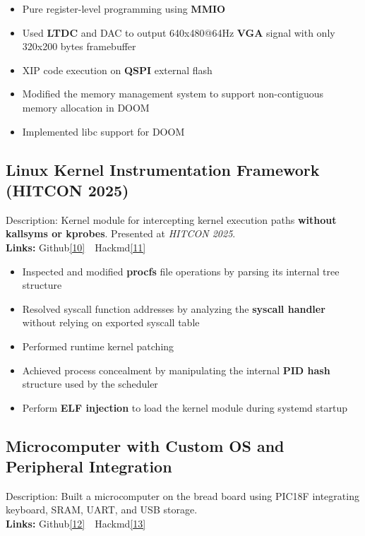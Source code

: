 \documentclass[11pt]{article}
\begin{document}
\begin{itemize}
  \item Pure register-level programming using \textbf{MMIO}
  \item Used \textbf{LTDC} and DAC to output 640x480@64Hz \textbf{VGA} signal with only 320x200 bytes framebuffer
  \item XIP code execution on \textbf{QSPI} external flash
  \item Modified the memory management system to support non-contiguous memory allocation in DOOM
  \item Implemented libc support for DOOM
\end{itemize}

\subsection*{Linux Kernel Instrumentation Framework (HITCON 2025)}
\vspace{1pt}
Description: Kernel module for intercepting kernel execution paths \textbf{without kallsyms or kprobes}. Presented at \emph{HITCON 2025}.\\
{\small\textbf{Links:} Github\hyperlink{l10}{[10]}\ \ Hackmd\hyperlink{l11}{[11]}}

\begin{itemize}
  \item Inspected and modified \textbf{procfs} file operations by parsing its internal tree structure
  \item Resolved syscall function addresses by analyzing the \textbf{syscall handler} without relying on exported syscall table
  \item Performed runtime kernel patching
  \item Achieved process concealment by manipulating the internal \textbf{PID hash} structure used by the scheduler
  \item Perform \textbf{ELF injection} to load the kernel module during systemd startup
\end{itemize}

\subsection*{Microcomputer with Custom OS and Peripheral Integration}
\vspace{1pt}
Description: Built a microcomputer on the bread board using PIC18F integrating keyboard, SRAM, UART, and USB storage.\\
{\small\textbf{Links:} Github\hyperlink{l12}{[12]}\ \ Hackmd\hyperlink{l13}{[13]}}
\end{document}
